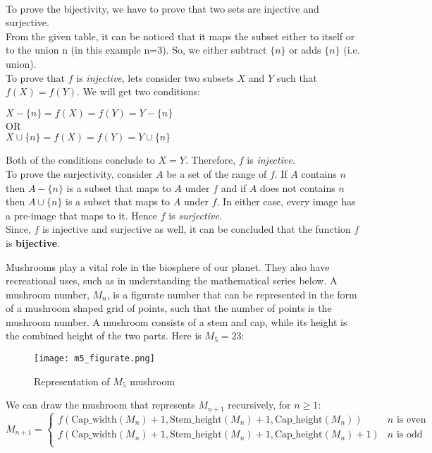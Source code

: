 \documentclass[addpoints]{exam}
\begin{document}
\begin{questions}
  \begin{solution}\\
    To prove the bijectivity, we have to prove that two sets are injective and surjective.
    \newline
    \\From the given table, it can be noticed that it maps the subset either to itself or to the union {n} (in this example n=3). So, we either subtract $\{n\}$ or adds $\{n\}$ (i.e. union).\\
    To prove that $f$ is \textit{injective}, lets consider two subsets $X$ and $Y$ such that $f(X)=f(Y)$. We will get two conditions:\\
    \begin{center}
        $X-\{n\}=f(X)=f(Y)=Y-\{n\}$ \\
        OR\\
        $X\cup\{n\}=f(X)=f(Y)=Y\cup\{n\}$ 
    \end{center}
    Both of the conditions conclude to $X=Y$. Therefore, $f$ is \textit{injective}. \\
    To prove the surjectivity, consider $A$ be a set of the range of  $f$. If $A$ contains $n$ then $A-\{n\}$ is a subset that maps to $A$ under $f$ and if $A$ does not contains $n$ then $A\cup\{n\}$ is a subset that maps to $A$ under $f$. In either case, every image has a pre-image that maps to it. Hence $f$ is \textit{surjective}.
    \newline
    \\Since, $f$ is injective and surjective as well, it can be concluded that the function $f$ is \textbf{bijective}.
    
  \end{solution}
  
\question Mushrooms play a vital role in the biosphere of our planet. They also have recreational uses, such as in understanding the mathematical series below. A mushroom number, $M_n$, is a figurate number that can be represented in the form of a mushroom shaped grid of points, such that the number of points is the mushroom number. A mushroom consists of a stem and cap, while its height is the combined height of the two parts. Here is $M_5=23$:

\begin{figure}[h]
  \centering
  \texttt{[image: m5\_figurate.png]}
  \caption{Representation of $M_5$ mushroom}
  \label{fig:mushroom_anatomy_1}
\end{figure}

We can draw the mushroom that represents $M_{n+1}$ recursively, for $n \geq 1$:
\[ 
    M_{n+1}=
    \begin{cases} 
      f(\textrm{Cap\_width}(M_n) + 1, \textrm{Stem\_height}(M_n) + 1, \textrm{Cap\_height}(M_n))  & n \textrm{ is even} \\
      f(\textrm{Cap\_width}(M_n) + 1, \textrm{Stem\_height}(M_n) + 1, \textrm{Cap\_height}(M_n)+1) & n \textrm{ is odd}  \\      
   \end{cases}
\]


\end{questions}
\end{document}
